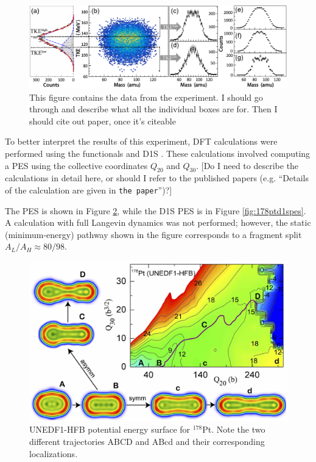 \begin{figure}
	\centering
	\includegraphics[width=0.95\linewidth]{TeX_files/178Pt_expt_data}
	\caption[$^{178}$Pt experimental data]{This figure contains the data from the {\Pt} experiment. I should go through and describe what all the individual boxes are for. Then I should cite out paper, once it's citeable}
	\label{fig:178ptexptdata}
\end{figure}

To better interpret the results of this experiment, DFT calculations were performed using the functionals {\hfb} \cite{Schunck2015} and D1S \cite{Berger1989}. These calculations involved computing a PES using the collective coordinates $Q_{20}$ and $Q_{30}$. [Do I need to describe the calculations in detail here, or should I refer to the published papers (e.g. ``Details of the calculation are given in \verb|the paper|'')?]

The {\hfb} PES is shown in Figure \ref{fig:178ptunedf1pes}, while the D1S PES is in Figure \ref{fig:178ptd1spes}. A calculation with full Langevin dynamics was not performed; however, the static (minimum-energy) pathway shown in the figure corresponds to a fragment split $A_L/A_H \approx 80/98$.

\begin{figure}
	\centering
	\includegraphics[width=0.7\linewidth]{TeX_files/178Pt_unedf1_pes}
	\caption[UNEDF1-HFB potential energy surface for $^{178}$Pt]{UNEDF1-HFB potential energy surface for $^{178}$Pt. Note the two different trajectories ABCD and ABcd and their corresponding localizations.}
	\label{fig:178ptunedf1pes}
\end{figure}

